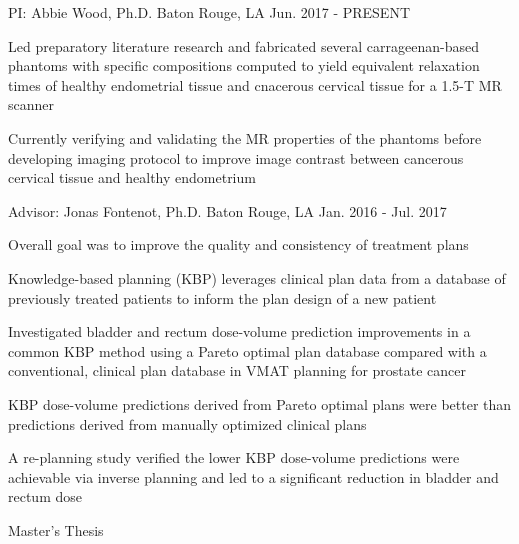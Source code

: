 
\begin{cventries}

  \cventry
    {PI: Abbie Wood, Ph.D.} %
    {} %
    {Baton Rouge, LA} %
    {Jun. 2017 - PRESENT} %
    {
      \begin{cvitems} %
        \item {Led preparatory literature research and fabricated several carrageenan-based phantoms with specific compositions computed to yield equivalent relaxation times of healthy endometrial tissue and cnacerous cervical tissue for a 1.5-T MR scanner}
        \item {Currently verifying and validating the MR properties of the phantoms before developing imaging protocol to improve image contrast between cancerous cervical tissue and healthy endometrium}
      \end{cvitems}
    }
    {}
\end{cventries}
%
\begin{cventries}
  \cventry
    {Advisor: Jonas Fontenot, Ph.D.} %
    {} %
    {Baton Rouge, LA} %
    {Jan. 2016 - Jul. 2017} %
    {
      \begin{cvitems} %
        \item {Overall goal was to improve the quality and consistency of treatment plans}
        \item {Knowledge-based planning (KBP) leverages clinical plan data from a database of previously treated patients to inform the plan design of a new patient}
        \item {Investigated bladder and rectum dose-volume prediction improvements in a common KBP method using a Pareto optimal plan database compared with a conventional, clinical plan database in VMAT planning for prostate cancer}
        \item {KBP dose-volume predictions derived from Pareto optimal plans were better than predictions derived from manually optimized clinical plans}
        \item {A re-planning study verified the lower KBP dose-volume predictions were achievable via inverse planning and led to a significant reduction in bladder and rectum dose}
      \end{cvitems}
    }
    {\textnormal{Master's Thesis}}
\end{cventries}
